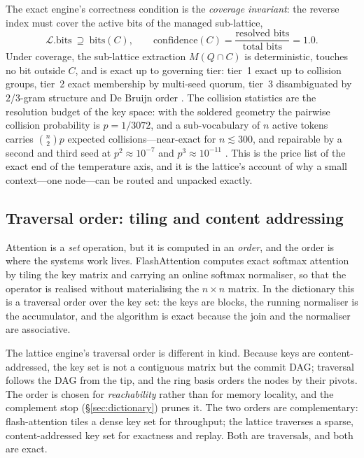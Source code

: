 \documentclass[11pt,a4paper]{article}
\theoremstyle{remark}
\newcommand{\Lut}{\ensuremath{\mathcal{L}}}             %
\begin{document}
The exact engine's correctness condition is the \emph{coverage invariant}:
the reverse index must cover the active bits of the managed sub-lattice,
\begin{equation}
\label{eq:coverage}
  \Lut.\mathrm{bits}\ \supseteq\ \mathrm{bits}(C),
  \qquad
  \mathrm{confidence}(C)=\frac{\text{resolved bits}}{\text{total bits}}=1.0 .
\end{equation}
Under coverage, the sub-lattice extraction $M(Q\cap C)$ is deterministic, touches
no bit outside $C$, and is exact up to governing tier: tier~1 exact up to
collision groups, tier~2 exact membership by multi-seed quorum, tier~3
disambiguated by $2$/$3$-gram structure and De Bruijn order
\cite{kspace2026}. The collision statistics are the resolution budget of the
key space: with the soldered geometry the pairwise collision probability is
$p=1/3072$, and a sub-vocabulary of $n$ active tokens carries
$\binom{n}{2}p$ expected collisions---near-exact for $n\lesssim 300$, and
repairable by a second and third seed at $p^2\approx10^{-7}$ and
$p^3\approx10^{-11}$ \cite{kspace2026}. This is the price list of the exact
end of the temperature axis, and it is the lattice's account of why a small
context---one node---can be routed and unpacked exactly.

\subsection{Traversal order: tiling and content addressing}

Attention is a \emph{set} operation, but it is computed in an \emph{order}, and
the order is where the systems work lives. FlashAttention \cite{dao2022}
computes exact softmax attention by tiling the key matrix and carrying an online
softmax normaliser, so that the operator is realised without materialising the
$n\times n$ matrix. In the dictionary this is a traversal order over the key
set: the keys are blocks, the running normaliser is the accumulator, and the
algorithm is exact because the join and the normaliser are associative.

The lattice engine's traversal order is different in kind. Because keys are
content-addressed, the key set is not a contiguous matrix but the commit DAG;
traversal follows the DAG from the tip, and the ring basis orders the nodes by
their pivots. The order is chosen for \emph{reachability} rather than for
memory locality, and the complement stop (\S\ref{sec:dictionary}) prunes it.
The two orders are complementary: flash-attention tiles a dense key set for
throughput; the lattice traverses a sparse, content-addressed key set for
exactness and replay. Both are traversals, and both are exact.
\end{document}
